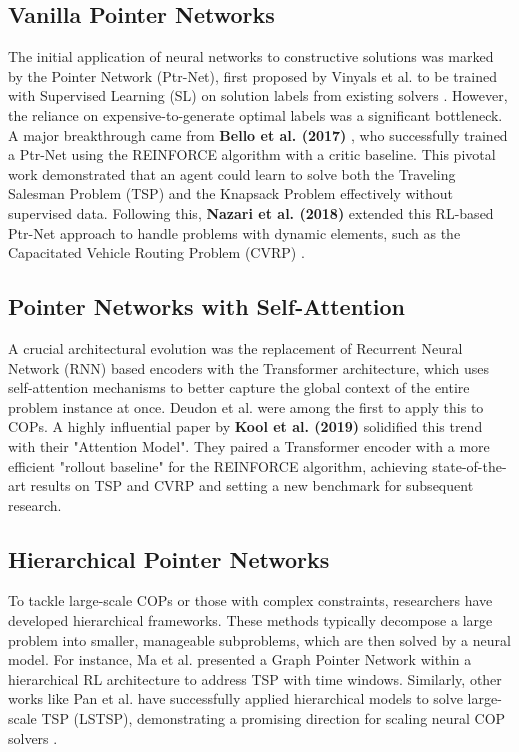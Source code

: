\subsection{Vanilla Pointer Networks}
The initial application of neural networks to constructive solutions was marked by the Pointer Network (Ptr-Net), first proposed by Vinyals et al. to be trained with Supervised Learning (SL) on solution labels from existing solvers \cite{vinyalsPointerNetworks2017}.
However, the reliance on expensive-to-generate optimal labels was a significant bottleneck. A major breakthrough came from \textbf{Bello et al. (2017)} \cite{belloNeuralCombinatorialOptimization2017}, who successfully trained a Ptr-Net using the REINFORCE algorithm with a critic baseline.
This pivotal work demonstrated that an agent could learn to solve both the Traveling Salesman Problem (TSP) and the Knapsack Problem effectively without supervised data.
Following this, \textbf{Nazari et al. (2018)} extended this RL-based Ptr-Net approach to handle problems with dynamic elements, such as the Capacitated Vehicle Routing Problem (CVRP) \cite{nazariReinforcementLearningSolving2018}.

\subsection{Pointer Networks with Self-Attention}
A crucial architectural evolution was the replacement of Recurrent Neural Network (RNN) based encoders with the Transformer architecture, which uses self-attention mechanisms to better capture the global context of the entire problem instance at once.
Deudon et al. were among the first to apply this to COPs. A highly influential paper by \textbf{Kool et al. (2019)} \cite{koolAttentionLearnSolve2019a} solidified this trend with their "Attention Model". They paired a Transformer encoder with a more efficient "rollout baseline" for the REINFORCE algorithm, achieving state-of-the-art results on TSP and CVRP and setting a new benchmark for subsequent research.

\subsection{Hierarchical Pointer Networks}
To tackle large-scale COPs or those with complex constraints, researchers have developed hierarchical frameworks.
These methods typically decompose a large problem into smaller, manageable subproblems, which are then solved by a neural model.
For instance, Ma et al. presented a Graph Pointer Network within a hierarchical RL architecture to address TSP with time windows.
Similarly, other works like Pan et al. have successfully applied hierarchical models to solve large-scale TSP (LSTSP), demonstrating a promising direction for scaling neural COP solvers \cite{wangSolvingCombinatorialOptimization2024}.

